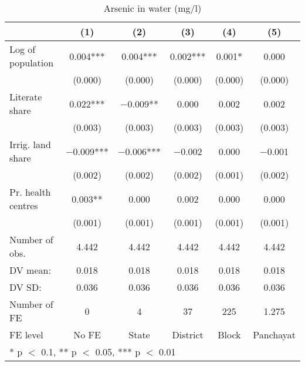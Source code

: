 \begin{table}

\caption{\label{tab:}Arsenic in water (mg/l)}
\centering
\begin{tabular}[t]{lccccc}
\toprule
  & (1) & (2) & (3) & (4) & (5)\\
\midrule
Log of population & \num{0.004}*** & \num{0.004}*** & \num{0.002}*** & \num{0.001}* & \num{0.000}\\
 & (\num{0.000}) & (\num{0.000}) & (\num{0.000}) & (\num{0.000}) & (\num{0.000})\\
Literate share & \num{0.022}*** & \num{-0.009}** & \num{0.000} & \num{0.002} & \num{0.002}\\
 & (\num{0.003}) & (\num{0.003}) & (\num{0.003}) & (\num{0.003}) & (\num{0.003})\\
Irrig. land share & \num{-0.009}*** & \num{-0.006}*** & \num{-0.002} & \num{0.000} & \num{-0.001}\\
 & (\num{0.002}) & (\num{0.002}) & (\num{0.002}) & (\num{0.001}) & (\num{0.002})\\
Pr. health centres & \num{0.003}** & \num{0.000} & \num{0.002} & \num{0.000} & \num{0.000}\\
 & (\num{0.001}) & (\num{0.001}) & (\num{0.001}) & (\num{0.001}) & (\num{0.001})\\
\midrule
Number of obs. & \num{4,442} & \num{4,442} & \num{4,442} & \num{4,442} & \num{4,442}\\
DV mean: & \num{0.018} & \num{0.018} & \num{0.018} & \num{0.018} & \num{0.018}\\
DV SD: & \num{0.036} & \num{0.036} & \num{0.036} & \num{0.036} & \num{0.036}\\
Number of FE & \num{0} & \num{4} & \num{37} & \num{225} & \num{1,275}\\
FE level & No FE & State & District & Block & Panchayat\\
\bottomrule
\multicolumn{6}{l}{\rule{0pt}{1em}* p $<$ 0.1, ** p $<$ 0.05, *** p $<$ 0.01}\\
\end{tabular}
\end{table}
